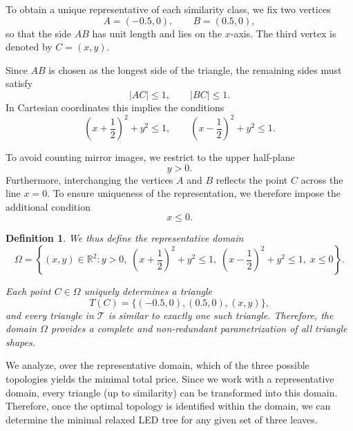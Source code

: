 \documentclass[openany]{book}
\newtheorem{definition}{Definition}
\begin{document}
	To obtain a unique representative of each similarity class, we fix two vertices
	\[
	A = (-0.5,0), \qquad B = (0.5,0),
	\]
	so that the side $AB$ has unit length and lies on the $x$-axis. 
	The third vertex is denoted by $C = (x,y)$.
	
	Since $AB$ is chosen as the longest side of the triangle, the remaining sides 
	must satisfy
	\[
	|AC| \le 1, \qquad |BC| \le 1.
	\]
	In Cartesian coordinates this implies the conditions
	\[
	\left(x+\frac12\right)^2+y^2 \le 1,
	\qquad
	\left(x-\frac12\right)^2+y^2 \le 1.
	\]
	
	To avoid counting mirror images, we restrict to the upper half-plane
	\[
	y > 0.
	\]
	Furthermore, interchanging the vertices $A$ and $B$ reflects the point $C$ across 
	the line $x = 0$. To ensure uniqueness of the representation, 
	we therefore impose the additional condition
	\[
	x\le0.
	\]
	\begin{definition}\label{def:domain}
	We thus define the representative domain
	\[
	\Omega =
	\left\{
	(x,y) \in \mathbb{R}^2 :
	y > 0,\;
	\left(x+\frac12\right)^2 + y^2 \le 1,\;
	\left(x-\frac12\right)^2 + y^2 \le 1,\;
	x \le 0
	\right\}.
	\]
	
	Each point $C \in \Omega$ uniquely determines a triangle
	\[
	T(C) = \{(-0.5,0), (0.5,0), (x,y)\},
	\]
	and every triangle in $\mathcal{T}$ is similar to exactly one such triangle. 
	Therefore, the domain $\Omega$ provides a complete and non-redundant 
	parametrization of all triangle shapes.
	\end{definition}
	We analyze, over the representative domain, which of the three possible
	topologies yields the minimal total price. Since we work with a representative
	domain, every triangle (up to similarity) can be transformed into this domain.
	Therefore, once the optimal topology is identified within the domain, we can
	determine the minimal relaxed LED tree for any given set of three leaves.
	
\end{document}
